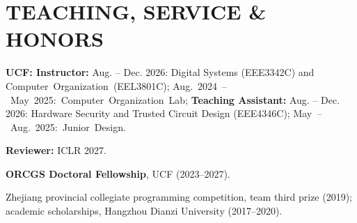 \documentclass[letterpaper,10pt]{article}
\begin{document}
\begingroup
\titlespacing*{\section}{0pt}{5pt}{4pt}
\section{TEACHING, SERVICE \& HONORS}
\fontsize{10.3}{11.8}\selectfont
\textbf{UCF: Instructor:} Aug. -- Dec. 2026: Digital Systems (EEE3342C) and \mbox{Computer Organization (EEL3801C)}; \mbox{Aug. 2024 -- May 2025: Computer Organization Lab}; \textbf{Teaching Assistant:} Aug. -- Dec. 2026: Hardware Security and Trusted Circuit Design (EEE4346C); \mbox{May -- Aug. 2025: Junior Design}.\par
\textbf{Reviewer:} ICLR 2027.\par
\textbf{ORCGS Doctoral Fellowship}, UCF (2023--2027).\par
Zhejiang provincial collegiate programming competition, team third prize (2019); academic scholarships, Hangzhou Dianzi University (2017--2020).
\par\endgroup
\end{document}
